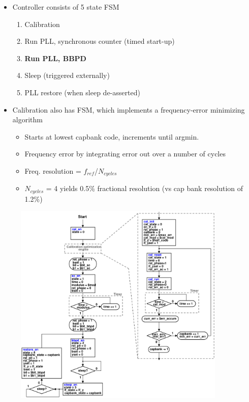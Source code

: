 			\begin{itemize}[itemsep=4pt,label=\protect---]
			        \item Controller consists of 5 state FSM
					\begin{enumerate}[itemsep=4pt,label=\arabic*]
						\item Calibration
						\item Run PLL, synchronous counter (timed start-up)
						\item \textbf{Run PLL, BBPD} 
						\item Sleep (triggered externally)
						\item PLL restore (when sleep de-asserted)
					\end{enumerate}
					\item Calibration also has FSM, which implements a frequency-error minimizing algorithm 
					\begin{itemize}[itemsep=4pt,label=$\bullet$]
						\item Starts at lowest capbank code, increments until argmin.
						\item Frequency error by integrating error out over a number of cycles
						\item Freq. resolution = $f_{ref}$/$N_{cycles}$
						\item $N_{cycles}$ = 4 yields 0.5\% fractional resolution (vs cap bank resolution of 1.2\%)
					\end{itemize}
			\end{itemize}

			\begin{figure}[htb!]
			        \centering
			        \includegraphics[width=0.9\textwidth, angle=0]{./figs/pll_asm}
			\end{figure}


